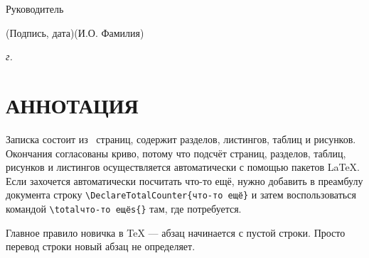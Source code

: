 \documentclass[14pt, russian]{scrartcl}
\begin{document}
\begin{titlepage}
\bigskip

\noindent Руководитель  \hfill \underline{\hspace{4cm}}\quad
\underline{\hspace{4cm}}

\vspace{-2ex}
\noindent\hspace{13.5ex}\normalsize\hspace{170pt}\hspace{2ex}\scriptsize{(Подпись, дата)}\normalsize\hspace{30pt}\hspace{6ex}\scriptsize{(И.О. Фамилия)}\normalsize
\vfill

 


\begin{center}
\textsl{\the\year{} г.}
\end{center}
\end{titlepage}


\setlength{\tabcolsep}{3pt}
\newpage
\setcounter{page}{2}
\section*{АННОТАЦИЯ}

Записка состоит из~\pageref{TotPages} страниц, содержит \totalsections{} разделов, \totallistings{} листингов, \totaltables{} таблиц и \totalfigures{} рисунков. Окончания согласованы криво, потому что подсчёт страниц, разделов, таблиц, рисунков и листингов осуществляется автоматически с помощью пакетов \LaTeX{}. Если захочется автоматически посчитать что-то ещё, нужно добавить в преамбулу документа строку \texttt{\textbackslash DeclareTotalCounter\{что-то ещё\}} и затем воспользоваться командой \texttt{\textbackslash totalчто-то ещёs\{\}} там, где потребуется.

\newpage
\renewcommand\contentsname{\hfill{\normalfont{СОДЕРЖАНИЕ}}\hfill}  %
\tableofcontents
\newpage
{}  %

Главное правило новичка в \TeX{} --- абзац начинается с пустой строки. Просто перевод строки новый абзац не определяет.
\end{document}
